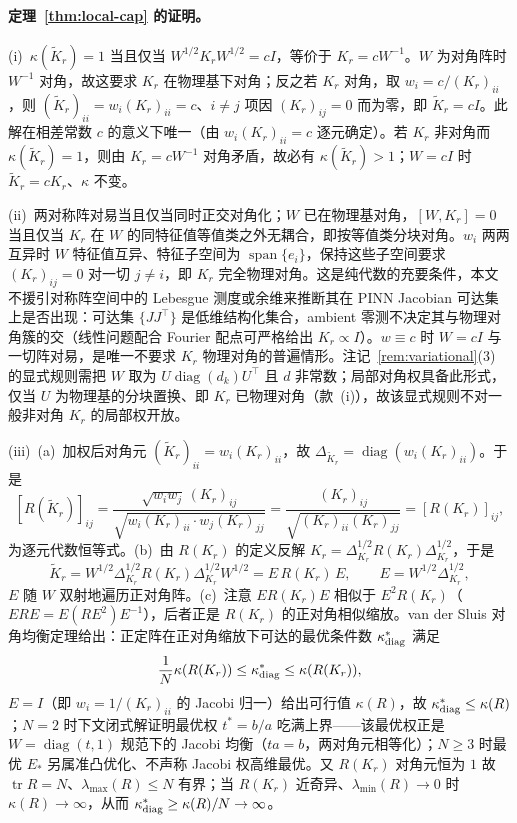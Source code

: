 \documentclass[fontset=windows,11pt]{ctexart}
\newcommand{\W}{W}
\DeclareMathOperator{\diag}{diag}
\DeclareMathOperator{\tr}{tr}
\DeclareMathOperator{\spanop}{span}
\numberwithin{equation}{section}
\begin{document}
\paragraph{定理~\ref{thm:local-cap} 的证明。}
\par\noindent(i)~$\kappa(\widetilde K_r)=1$ 当且仅当 $\W^{1/2}K_r\W^{1/2}=cI$，等价于 $K_r=c\W^{-1}$。$\W$ 为对角阵时 $\W^{-1}$ 对角，故这要求 $K_r$ 在物理基下对角；反之若 $K_r$ 对角，取 $w_i=c/(K_r)_{ii}$，则 $(\widetilde K_r)_{ii}=w_i(K_r)_{ii}=c$、$i\ne j$ 项因 $(K_r)_{ij}=0$ 而为零，即 $\widetilde K_r=cI$。此解在相差常数 $c$ 的意义下唯一（由 $w_i(K_r)_{ii}=c$ 逐元确定）。若 $K_r$ 非对角而 $\kappa(\widetilde K_r)=1$，则由 $K_r=c\W^{-1}$ 对角矛盾，故必有 $\kappa(\widetilde K_r)>1$；$\W=cI$ 时 $\widetilde K_r=cK_r$、$\kappa$ 不变。
\par\noindent(ii)~两对称阵对易当且仅当同时正交对角化；$\W$ 已在物理基对角，$[\W,K_r]=0$ 当且仅当 $K_r$ 在 $\W$ 的同特征值等值类之外无耦合，即按等值类分块对角。$w_i$ 两两互异时 $\W$ 特征值互异、特征子空间为 $\spanop\{e_i\}$，保持这些子空间要求 $(K_r)_{ij}=0$ 对一切 $j\ne i$，即 $K_r$ 完全物理对角。这是纯代数的充要条件，本文不援引对称阵空间中的 Lebesgue 测度或余维来推断其在 PINN Jacobian 可达集上是否出现：可达集 $\{JJ^\top\}$ 是低维结构化集合，ambient 零测不决定其与物理对角簇的交（线性问题配合 Fourier 配点可严格给出 $K_r\propto I$）。$w\equiv c$ 时 $\W=cI$ 与一切阵对易，是唯一不要求 $K_r$ 物理对角的普遍情形。注记~\ref{rem:variational}(3) 的显式规则需把 $\W$ 取为 $U\diag(d_k)U^\top$ 且 $d$ 非常数；局部对角权具备此形式，仅当 $U$ 为物理基的分块置换、即 $K_r$ 已物理对角（款~(i)），故该显式规则不对一般非对角 $K_r$ 的局部权开放。
\par\noindent(iii)~(a)~加权后对角元 $(\widetilde K_r)_{ii}=w_i(K_r)_{ii}$，故 $\Delta_{\widetilde K_r}=\diag(w_i(K_r)_{ii})$。于是
\[
[R(\widetilde K_r)]_{ij}=\frac{\sqrt{w_iw_j}\,(K_r)_{ij}}{\sqrt{w_i(K_r)_{ii}\cdot w_j(K_r)_{jj}}}
=\frac{(K_r)_{ij}}{\sqrt{(K_r)_{ii}(K_r)_{jj}}}=[R(K_r)]_{ij},
\]
为逐元代数恒等式。(b)~由 $R(K_r)$ 的定义反解 $K_r=\Delta_{K_r}^{1/2}R(K_r)\Delta_{K_r}^{1/2}$，于是
\[
\widetilde K_r=\W^{1/2}\Delta_{K_r}^{1/2}R(K_r)\Delta_{K_r}^{1/2}\W^{1/2}=E\,R(K_r)\,E,\qquad
E=\W^{1/2}\Delta_{K_r}^{1/2},
\]
$E$ 随 $\W$ 双射地遍历正对角阵。(c)~注意 $E R(K_r) E$ 相似于 $E^2R(K_r)$（$E R E=E(R E^2)E^{-1}$），后者正是 $R(K_r)$ 的正对角相似缩放。van der Sluis 对角均衡定理\cite{vanderSluis1969}给出：正定阵在正对角缩放下可达的最优条件数 $\kappa^*_{\rm diag}$ 满足
\[
\frac1N\kappa(R(K_r))\le\kappa^*_{\rm diag}\le\kappa(R(K_r)),
\]
$E=I$（即 $w_i=1/(K_r)_{ii}$ 的 Jacobi 归一）给出可行值 $\kappa(R)$，故 $\kappa^*_{\rm diag}\le\kappa(R)$；$N=2$ 时下文闭式解证明最优权 $t^*=b/a$ 吃满上界——该最优权正是 $\W=\diag(t,1)$ 规范下的 Jacobi 均衡（$ta=b$，两对角元相等化）；$N\ge3$ 时最优 $E_*$ 另属准凸优化、不声称 Jacobi 权高维最优。又 $R(K_r)$ 对角元恒为 $1$ 故 $\tr R=N$、$\lambda_{\max}(R)\le N$ 有界；当 $R(K_r)$ 近奇异、$\lambda_{\min}(R)\to0$ 时 $\kappa(R)\to\infty$，从而 $\kappa^*_{\rm diag}\ge\kappa(R)/N\to\infty$。
\end{document}
